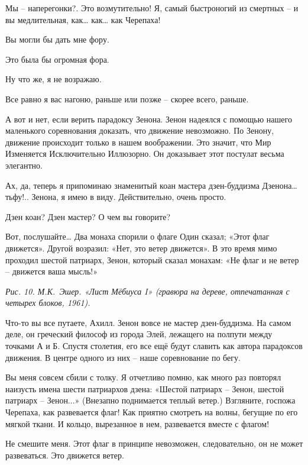 \documentclass[../main.tex]{subfiles}
\begin{document}
\begin{dialogue}
 Мы \--- наперегонки?. Это возмутительно! Я, самый быстроногий из смертных \--- и вы медлительная, как\ldots{} как\ldots{} как Черепаха!

 Вы могли бы дать мне фору.

 Это была бы огромная фора.

 Ну что же, я не возражаю.

 Все равно я вас нагоню, раньше или позже \--- скорее всего, раньше.

 А вот и нет, если верить парадоксу Зенона. Зенон надеялся с помощью нашего маленького соревнования доказать, что движение невозможно. По Зенону, движение происходит только в нашем воображении. Это значит, что Мир Изменяется Исключительно Иллюзорно. Он доказывает этот постулат весьма элегантно.

 Ах, да, теперь я припоминаю знаменитый коан мастера дзен-буддизма Дзенона\ldots{} тьфу!.. Зенона, я имею в виду. Действительно, очень просто.

 Дзен коан? Дзен мастер? О чем вы говорите?

 Вот, послушайте\ldots{} Два монаха спорили о флаге Один сказал; «Этот флаг движется». Другой возразил: «Нет, это ветер движется». В это время мимо проходил шестой патриарх, Зенон, который сказал монахам: «Не флаг и не ветер \--- движется ваша мысль!»

\emph{Рис. 10. М.К.~Эшер. «Лист Мёбиуса I» (гравюра на дереве, отпечатанная с четырех блоков, 1961).}

 Что-то вы все путаете, Ахилл. Зенон вовсе не мастер дзен-буддизма. На самом деле, он греческий философ из города Элей, лежащего на полпути между точками А и Б. Спустя столетия, его все ещё будут славить как автора парадоксов движения. В центре одного из них \--- наше соревнование по бегу.

 Вы меня совсем сбили с толку. Я отчетливо помню, как много раз повторял наизусть имена шести патриархов дзена: «Шестой патриарх \--- Зенон, шестой патриарх \--- Зенон...» (Внезапно поднимается теплый ветер.) Взгляните, госпожа Черепаха, как развевается флаг! Как приятно смотреть на волны, бегущие по его мягкой ткани. И кольцо, вырезанное в нем, развевается вместе с флагом!

 Не смешите меня. Этот флаг в принципе невозможен, следовательно, он не может развеваться. Это движется ветер.


\end{dialogue}
\end{document}
